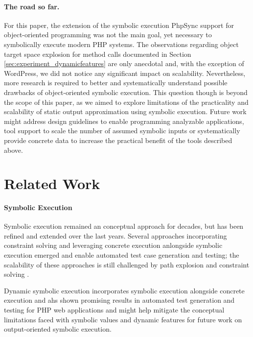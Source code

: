 \documentclass[sigconf]{acmart}
\renewcommand{\sf}[1]{\textsf{#1}}
\begin{document}
\paragraph{The road so far.}
For this paper, the extension of the symbolic execution \sf{PhpSync} \cite{Nguyen:2014:BCG:2635868.2635928}
support for object-oriented programming was not the main goal, yet necessary to
symbolically execute modern PHP systems. The observations regarding object
target space explosion for method calls documented in Section
\ref{sec:experiment_dynamicfeatures} are only anecdotal and, with the exception
of \sf{WordPress}, we did not notice any significant impact on scalability.
Nevertheless, more research is required to better and systematically understand
possible drawbacks of object-oriented symbolic execution. 
This question though is beyond the scope of this paper, as we aimed
to explore limitations of the practicality and scalability of static output
approximation using symbolic execution. Future work might address design
guidelines to enable programming analyzable applications, tool support to scale
the number of assumed symbolic inputs or systematically provide concrete data
to increase the practical benefit of the tools described above.


\section{Related Work} \label{sec:related_work}

\paragraph{Symbolic Execution}
Symbolic execution \cite{King1976,Darringer1978} remained an conceptual approach
for decades, but has been refined and extended over the last years. Several
approaches incorporating constraint solving and leveraging concrete execution
anlongside symbolic execution emerged and enable automated test case generation
and testing; the scalability of these approaches is still challenged by path
explosion and constraint solving \cite{CadarSen2013}. 

Dynamic symbolic execution \cite{CadarSen2013} incorporates symbolic execution
alongside concrete execution and ahs shown promising results in automated test
generation and testing \cite{artzi_finding_2008,artzi_finding_2010,DynamicWassermann} for PHP web
applications and might help mitigate the conceptual limitations faced with
symbolic values and dynamic features for future work on output-oriented
symbolic execution.
\end{document}
